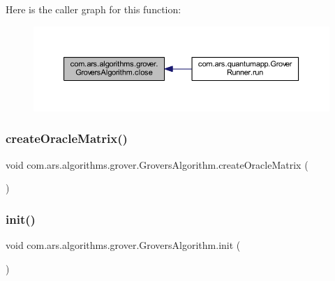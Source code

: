 Here is the caller graph for this function\+:\nopagebreak
\begin{figure}[H]
\begin{center}
\leavevmode
\includegraphics[width=350pt]{classcom_1_1ars_1_1algorithms_1_1grover_1_1_grovers_algorithm_a0df6e611d65aed02934b95df8414fac0_icgraph}
\end{center}
\end{figure}
\hypertarget{classcom_1_1ars_1_1algorithms_1_1grover_1_1_grovers_algorithm_aaba2e3f570bd14cf35d8f81a0046075f}{}\label{classcom_1_1ars_1_1algorithms_1_1grover_1_1_grovers_algorithm_aaba2e3f570bd14cf35d8f81a0046075f} 
\subsubsection{\texorpdfstring{create\+Oracle\+Matrix()}{createOracleMatrix()}}
{\footnotesize\ttfamily void com.\+ars.\+algorithms.\+grover.\+Grovers\+Algorithm.\+create\+Oracle\+Matrix (\begin{DoxyParamCaption}{ }\end{DoxyParamCaption})}

\hypertarget{classcom_1_1ars_1_1algorithms_1_1grover_1_1_grovers_algorithm_ae2825f36c10e6c822aef9da35992bef3}{}\label{classcom_1_1ars_1_1algorithms_1_1grover_1_1_grovers_algorithm_ae2825f36c10e6c822aef9da35992bef3} 
\subsubsection{\texorpdfstring{init()}{init()}}
{\footnotesize\ttfamily void com.\+ars.\+algorithms.\+grover.\+Grovers\+Algorithm.\+init (\begin{DoxyParamCaption}{ }\end{DoxyParamCaption})}

